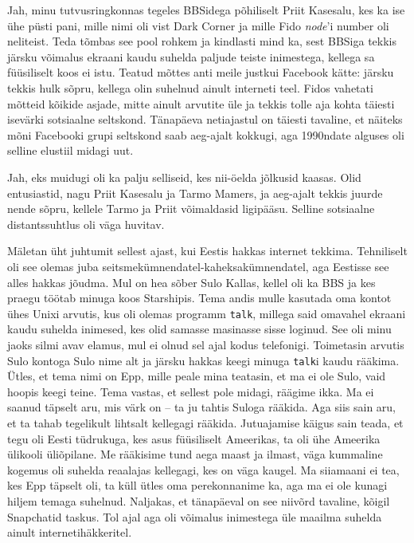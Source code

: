 Jah, minu tutvusringkonnas tegeles BBSidega põhiliselt Priit 
Kasesalu, kes 
ka ise ühe püsti pani, mille nimi oli vist Dark Corner ja mille Fido \emph{node}'i number oli neliteist. 
Teda tõmbas see pool rohkem ja 
kindlasti mind ka, sest BBSiga tekkis järsku võimalus ekraani kaudu suhelda 
paljude teiste inimestega, kellega sa füüsiliselt koos ei istu. 
Teatud mõttes anti meile justkui 
Facebook kätte: 
järsku tekkis hulk sõpru, kellega olin suhelnud ainult interneti teel. Fidos 
vahetati mõtteid kõikide asjade, mitte ainult arvutite üle ja tekkis 
tolle aja kohta täiesti isevärki sotsiaalne seltskond. Tänapäeva netiajastul on 
täiesti tavaline, et näiteks mõni Facebooki grupi seltskond saab aeg-ajalt 
kokkugi, aga 1990ndate alguses oli selline elustiil midagi uut.


Jah, eks muidugi oli ka palju selliseid, kes nii-öelda jõlkusid kaasas. Olid 
entusiastid, nagu Priit Kasesalu 
ja Tarmo Mamers, ja aeg-ajalt tekkis juurde nende 
sõpru, kellele Tarmo ja Priit võimaldasid 
ligipääsu. Selline sotsiaalne 
distantssuhtlus oli väga huvitav. 

Mäletan üht juhtumit sellest ajast, kui Eestis hakkas internet tekkima. 
Tehniliselt oli see olemas juba 
seitsmekümnendatel-kaheksakümnendatel, aga Eestisse see alles hakkas jõudma. 
Mul on hea sõber 
Sulo Kallas, kellel oli ka BBS ja kes praegu 
töötab minuga koos Starshipis. Tema andis 
mulle kasutada oma kontot ühes Unixi arvutis, kus oli olemas 
programm \verb|talk|, millega said omavahel ekraani kaudu suhelda 
inimesed, kes olid samasse masinasse sisse loginud. See oli minu 
jaoks silmi avav elamus, mul ei olnud sel ajal 
kodus telefonigi. Toimetasin arvutis Sulo kontoga Sulo nime alt 
ja järsku hakkas keegi minuga \verb|talk|i kaudu 
rääkima. Ütles, et tema nimi on Epp, mille peale mina teatasin, et ma ei ole 
Sulo, vaid hoopis keegi
teine. Tema vastas, et sellest pole midagi, räägime ikka. Ma ei 
saanud täpselt aru, mis värk on -- ta ju tahtis Suloga rääkida. Aga siis sain 
aru, et ta tahab tegelikult lihtsalt kellegagi 
rääkida.  
Jutuajamise käigus sain teada, et  
tegu oli Eesti tüdrukuga, kes asus füüsiliselt 
Ameerikas, ta oli ühe Ameerika ülikooli üliõpilane. 
Me rääkisime tund aega maast ja ilmast, väga kummaline kogemus oli suhelda 
reaalajas kellegagi, kes on väga kaugel. Ma siiamaani ei tea, 
kes Epp täpselt oli, ta küll ütles oma perekonnanime ka, aga ma ei ole kunagi 
hiljem temaga suhelnud. Naljakas, et 
tänapäeval on see niivõrd tavaline, kõigil Snapchatid taskus. Tol ajal aga oli 
võimalus 
inimestega üle maailma suhelda ainult internetihäkkeritel.

